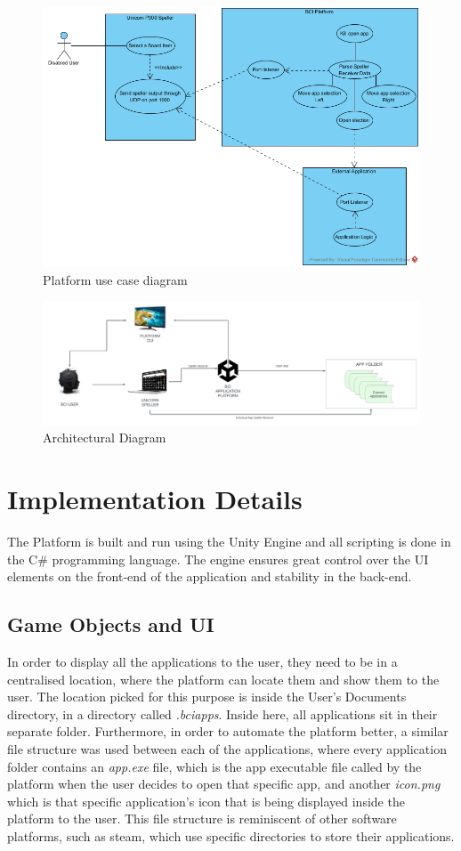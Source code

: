 \begin{figure}[H]
  \centering
  \includegraphics[width=1\textwidth]{Diagrams/Platform Use Case.jpg}
  \caption{Platform use case diagram}
\end{figure}
\begin{figure}[H]
  \centering
  \includegraphics[width=1\textwidth]{Diagrams/Platform Architectural Diagram.png}
  \caption{Architectural Diagram}
\end{figure}


\section{Implementation Details}
The Platform is built and run using the Unity Engine and all scripting is done in the C\# programming language. The engine ensures great control over the UI elements on the front-end of the application and stability in the back-end.

\subsection{Game Objects and UI}
In order to display all the applications to the user, they need to be in a centralised location, where the platform can locate them and show them to the user. The location picked for this purpose is inside the User's Documents directory, in a directory called \textit{.bciapps}. Inside here, all applications sit in their separate folder. Furthermore, in order to automate the platform better, a similar file structure was used between each of the applications, where every application folder contains an \textit{app.exe} file, which is the app executable file called by the platform when the user decides to open that specific app, and another \textit{icon.png} which is that specific application's icon that is being displayed inside the platform to the user. This file structure is reminiscent of other software platforms, such as steam, which use specific directories to store their applications.

